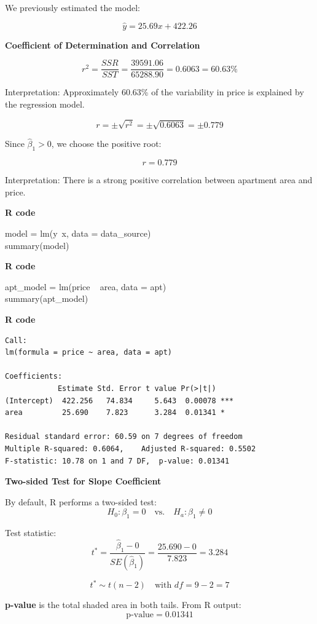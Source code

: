 \begin{example}
We previously estimated the model:

\[
\hat{y} = 25.69x + 422.26
\]

\textbf{Coefficient of Determination and Correlation}

\[
r^2 = \frac{SSR}{SST} = \frac{39591.06}{65288.90} = 0.6063 = 60.63\%
\]

Interpretation: Approximately 60.63\% of the variability in price is explained by the regression model.

\[
r = \pm \sqrt{r^2} = \pm \sqrt{0.6063} = \pm 0.779
\]

Since \( \hat{\beta}_1 > 0 \), we choose the positive root:

\[
r = 0.779
\]

Interpretation: There is a strong positive correlation between apartment area and price.

\noindent\textbf{R code}
\begin{tcolorbox}[colback=gray!10, colframe=black!45, arc=2mm]
model = lm(y~x, data = data\_source) \\
summary(model)
\end{tcolorbox}

\noindent\textbf{R code}
\begin{tcolorbox}[colback=gray!10, colframe=black!45, arc=2mm]
apt\_model = lm(price ~ area, data = apt) \\
summary(apt\_model)
\end{tcolorbox}

\noindent\textbf{R code}
\begin{tcolorbox}[colback=gray!10, colframe=black!45, arc=2mm]
\begin{verbatim}
Call:
lm(formula = price ~ area, data = apt)

Coefficients:
            Estimate Std. Error t value Pr(>|t|)
(Intercept)  422.256   74.834     5.643  0.00078 ***
area         25.690    7.823      3.284  0.01341 *

Residual standard error: 60.59 on 7 degrees of freedom
Multiple R-squared: 0.6064,    Adjusted R-squared: 0.5502 
F-statistic: 10.78 on 1 and 7 DF,  p-value: 0.01341
\end{verbatim}
\end{tcolorbox}

\textbf{Two-sided Test for Slope Coefficient}

By default, R performs a two-sided test:
\[
H_0: \beta_1 = 0 \quad \text{vs.} \quad H_a: \beta_1 \neq 0
\]

\vspace{0.3cm}

Test statistic:
\[
t^* = \frac{\hat{\beta}_1 - 0}{SE(\hat{\beta}_1)} = \frac{25.690 - 0}{7.823} = 3.284
\]

\[
t^* \sim t(n - 2) \quad \text{with } df = 9 - 2 = 7
\]

\vspace{0.5cm}

\textbf{p-value} is the total shaded area in both tails. From R output:
\[
\text{p-value} = 0.01341
\]

\end{example}
